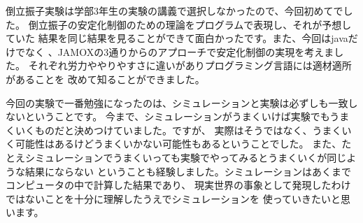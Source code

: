  倒立振子実験は学部3年生の実験の講義で選択しなかったので、今回初めてでした。
  倒立振子の安定化制御のための理論をプログラムで表現し、それが予想していた
  結果を同じ結果を見ることができて面白かったです。また、今回はjavaだけでなく
  \MaTX{}、JAMOXの3通りからのアプローチで安定化制御の実現を考えました。
  それぞれ労力ややりやすさに違いがありプログラミング言語には適材適所があることを
  改めて知ることができました。
  \par
  今回の実験で一番勉強になったのは、シミュレーションと実験は必ずしも一致しないということです。
  今まで、シミュレーションがうまくいけば実験でもうまくいくものだと決めつけていました。ですが、
  実際はそうではなく、うまくいく可能性はあるけどうまくいかない可能性もあるということでした。
  また、たとえシミュレーションでうまくいっても実験でやってみるとうまくいくが同じような結果にならない
  ということも経験しました。シミュレーションはあくまでコンピュータの中で計算した結果であり、
  現実世界の事象として発現したわけではないことを十分に理解したうえでシミュレーションを
  使っていきたいと思います。
  
  